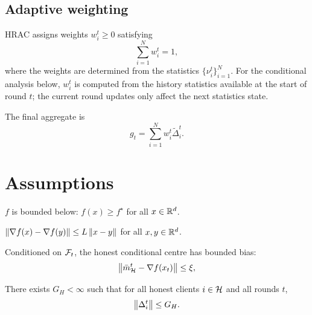 
\subsection{Adaptive weighting}

HRAC assigns weights \(w_i^t \ge 0\) satisfying
\begin{equation}
    \sum_{i=1}^N w_i^t = 1,
    \label{eq:weight_simplex}
\end{equation}
where the weights are determined from the statistics
\(\{\nu_i^t\}_{i=1}^N\).
For the conditional analysis below, \(w_i^t\) is computed from the history
statistics available at the start of round \(t\); the current round updates
only affect the next statistics state.

The final aggregate is
\begin{equation}
    g_t = \sum_{i=1}^N w_i^t \tilde{\Delta}_i^t.
    \label{eq:aggregate}
\end{equation}

\section{Assumptions}

\begin{assumption}
\label{ass:lower_bounded}
\(f\) is bounded below: \(f(x)\ge f^\star\) for all \(x\in\mathbb{R}^d\).
\end{assumption}

\begin{assumption}[\(L\)-smoothness]
\label{ass:smooth}
\(\left\lVert \nabla f(x)-\nabla f(y) \right\rVert\le L\left\lVert x-y \right\rVert\) for all \(x,y\in\mathbb{R}^d\).
\end{assumption}

\begin{assumption}
\label{ass:bias_variance}
Conditioned on \(\mathcal{F}_t\), the honest conditional centre has bounded bias:
\begin{equation}
    \left\lVert 
        \bar m_{\mathcal{H}}^t - \nabla f(x_t)
     \right\rVert
    \le \xi,
    \label{eq:bias}
\end{equation}
\end{assumption}

\begin{assumption}
\label{ass:honest_update_bound}
There exists \(G_H<\infty\) such that for all honest clients \(i\in\mathcal{H}\) and
all rounds \(t\),
\begin{equation}
    \left\lVert \Delta_i^t \right\rVert\le G_H.
    \label{eq:honest_update_bound}
\end{equation}
\end{assumption}

